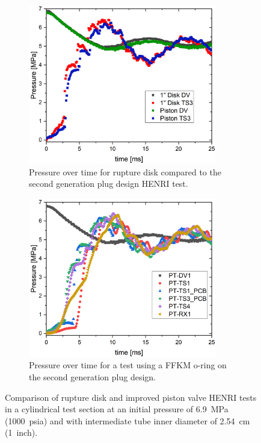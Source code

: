 \begin{figure}[tb]
    \vspace{16pt}
    \centering
    \begin{subfigure}[t]{0.45\textwidth}
        \centering
        \includegraphics[width=0.9\textwidth]{results/plots/BD_Piston_1000_overlay.png}
        \caption{Pressure over time for rupture disk compared to the second generation plug design HENRI test.}
        \label{fig:disk new}
    \end{subfigure}
    \hfill
    \begin{subfigure}[t]{0.45\textwidth}
        \centering
        \includegraphics[width=0.9\textwidth]{results/plots/1000psi_Mpa_25.png}
        \caption{Pressure over time for a test using a FFKM o-ring on the second generation plug design.}
        \label{fig:piston 1000psi 25ms}
    \end{subfigure}
    
    \caption{Comparison of rupture disk and improved piston valve HENRI tests in a cylindrical test section at an initial pressure of \SI{6.9}{\mega\pascal} (\SI{1000}{psia}) and with intermediate tube inner diameter of \SI{2.54}{\centi\meter} (\SI{1}{inch}).}
    \label{fig:new piston v disk}
    \vspace{16pt}
\end{figure}

